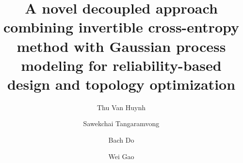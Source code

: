 \documentclass[preprint,3p]{elsarticle}
\begin{document}
\hypersetup{citecolor = red!50!black ,linkcolor= blue!50!black, urlcolor= blue!50!black}

\begin{frontmatter}


\title{A novel decoupled approach combining invertible cross-entropy method with Gaussian process modeling for reliability-based design and topology optimization}

\author[1]{Thu Van Huynh}
\address[1]{Center of Excellence in Applied Mechanics and Structures, Department of Civil Engineering, Chulalongkorn University, Bangkok 10330, Thailand}

\author[1]{Sawekchai Tangaramvong}

\author[2]{Bach Do}
\address[2]{Department of Civil and Environmental Engineering, University of Houston, Houston, TX 77204-4003, USA}

\author[3]{Wei Gao}
\address[3]{Centre for Infrastructure Engineering and Safety, School of Civil and Environmental Engineering, The University of New South Wales, Sydney, NSW 2052, Australia}


\end{frontmatter}
\end{document}
